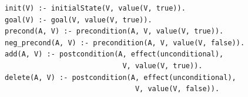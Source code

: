 \begin{lstlisting}[caption={Bridge encoding mapping plasp to internal format.},label={lst:bridge},style=asp]
init(V) :- initialState(V, value(V, true)).
goal(V) :- goal(V, value(V, true)).
precond(A, V) :- precondition(A, V, value(V, true)).
neg_precond(A, V) :- precondition(A, V, value(V, false)).
add(A, V) :- postcondition(A, effect(unconditional),
                            V, value(V, true)).
delete(A, V) :- postcondition(A, effect(unconditional),
                               V, value(V, false)).
\end{lstlisting}

